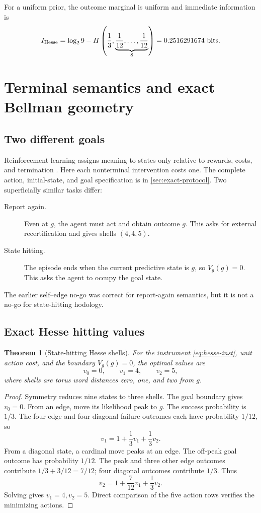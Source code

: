 \documentclass[11pt]{article}
\newtheorem{theorem}{Theorem}[section]
\theoremstyle{definition}
\theoremstyle{remark}
\begin{document}
For a uniform prior, the outcome marginal is uniform and immediate
information is
\[
I_{\rm Hesse}=\log_2 9-
H\left(\frac13,\underbrace{\frac1{12},\ldots,\frac1{12}}_8\right)
=0.2516291674\ {\rm bits}.
\]

\section{Terminal semantics and exact Bellman geometry}

\subsection{Two different goals}

Reinforcement learning assigns meaning to states only relative to rewards,
costs, and termination \cite{SuttonBarto2018,Puterman1994}. Here each
nonterminal intervention costs one. The complete action, initial-state, and
goal specification is in \cref{sec:exact-protocol}. Two superficially similar
tasks differ:
\begin{description}
\item[Report again.] Even at \(g\), the agent must act and obtain outcome
\(g\). This asks for external recertification and gives shells \((4,4,5)\).
\item[State hitting.] The episode ends when the current predictive state is
\(g\), so \(V_g(g)=0\). This asks the agent to occupy the goal state.
\end{description}
The earlier self--edge no-go was correct for report-again semantics, but it is
not a no-go for state-hitting hodology.

\subsection{Exact Hesse hitting values}

\begin{theorem}[State-hitting Hesse shells]
\label{thm:hesse}
For the instrument \cref{eq:hesse-inst}, unit action cost, and the boundary
\(V_g(g)=0\), the optimal values are
\[
\boxed{v_0=0,\qquad v_1=4,\qquad v_2=5,}
\]
where shells are torus word distances zero, one, and two from \(g\).
\end{theorem}
\begin{proof}
Symmetry reduces nine states to three shells. The goal boundary gives
\(v_0=0\). From an edge, move its likelihood peak to \(g\). The success
probability is \(1/3\). The four edge and four diagonal failure outcomes each
have probability \(1/12\), so
\[
v_1=1+\frac13v_1+\frac13v_2.
\tag{5.1}
\]
From a diagonal state, a cardinal move peaks at an edge. The off-peak goal
outcome has probability \(1/12\). The peak and three other edge outcomes
contribute \(1/3+3/12=7/12\); four diagonal outcomes contribute \(1/3\).
Thus
\[
v_2=1+\frac7{12}v_1+\frac13v_2.
\tag{5.2}
\]
Solving gives \(v_1=4,v_2=5\). Direct comparison of the five action rows
verifies the minimizing actions.
\end{proof}
\end{document}
